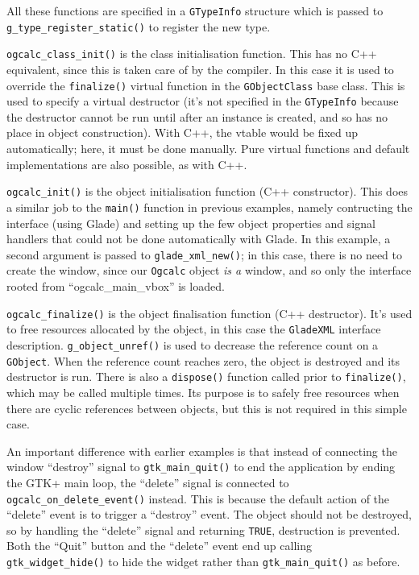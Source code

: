 \documentclass[a4paper,oneside]{article}
\newcommand{\class}[1]{\texttt{#1}}
\newcommand{\function}[1]{\texttt{#1()}}
\newcommand{\code}[1]{\texttt{#1}}
\begin{document}
All these functions are specified in a \class{GTypeInfo} structure
which is passed to \function{g\_type\_register\_static} to register the
new type.

\function{ogcalc\_class\_init} is the class initialisation function.
This has no C++ equivalent, since this is taken care of by the
compiler.  In this case it is used to override the \function{finalize}
virtual function in the \class{GObjectClass} base class.  This is used
to specify a virtual destructor (it's not specified in the
\class{GTypeInfo} because the destructor cannot be run until after an
instance is created, and so has no place in object construction).
With C++, the vtable would be fixed up automatically; here, it must be
done manually.  Pure virtual functions and default implementations are
also possible, as with C++.

\function{ogcalc\_init} is the object initialisation function
(C++ constructor).  This does a similar job to the \function{main}
function in previous examples, namely contructing the interface (using
Glade) and setting up the few object properties and signal handlers
that could not be done automatically with Glade.  In this example, a
second argument is passed to \function{glade\_xml\_new}; in this case,
there is no need to create the window, since our \class{Ogcalc} object
\emph{is a} window, and so only the interface rooted from
``ogcalc\_main\_vbox'' is loaded.

\function{ogcalc\_finalize} is the object finalisation function (C++
destructor).  It's used to free resources allocated by the object, in
this case the \class{GladeXML} interface description.
\function{g\_object\_unref} is used to decrease the reference count on
a \class{GObject}.  When the reference count reaches zero, the object
is destroyed and its destructor is run.  There is also a
\function{dispose} function called prior to \function{finalize}, which
may be called multiple times.  Its purpose is to safely free resources
when there are cyclic references between objects, but this is not
required in this simple case.

An important difference with earlier examples is that instead of
connecting the window ``destroy'' signal to \function{gtk\_main\_quit}
to end the application by ending the GTK+ main loop, the ``delete''
signal is connected to \function{ogcalc\_on\_delete\_event} instead.
This is because the default action of the ``delete'' event is to
trigger a ``destroy'' event.  The object should not be destroyed, so
by handling the ``delete'' signal and returning \code{TRUE},
destruction is prevented.  Both the ``Quit'' button and the ``delete''
event end up calling \function{gtk\_widget\_hide} to hide the widget
rather than \function{gtk\_main\_quit} as before.
\end{document}
